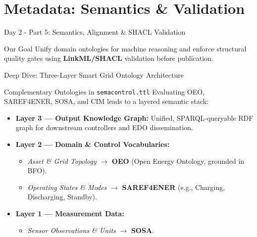\documentclass[aspectratio=169]{beamer}
\begin{document}
\section{Metadata: Semantics \& Validation}

\begin{frame}{Day 2 - Part 5: Semantics, Alignment \& SHACL Validation}
    \begin{block}{Our Goal}
        Unify domain ontologies for machine reasoning and enforce structural quality gates using \textbf{LinkML/SHACL} validation before publication.
    \end{block}
\end{frame}

\begin{frame}{Deep Dive: Three-Layer Smart Grid Ontology Architecture}
    \begin{block}{Complementary Ontologies in \texttt{semacontrol.ttl}}
        Evaluating OEO, SAREF4ENER, SOSA, and CIM leads to a layered semantic stack:
    \end{block}
    \begin{itemize}
        \item \textbf{Layer 3 — Output Knowledge Graph:} Unified, SPARQL-queryable RDF graph for downstream controllers and EDO dissemination.
        \item \textbf{Layer 2 — Domain \& Control Vocabularies:}
        \begin{itemize}
            \item \emph{Asset \& Grid Topology} $\rightarrow$ \textbf{OEO} (Open Energy Ontology, grounded in BFO).
            \item \emph{Operating States \& Modes} $\rightarrow$ \textbf{SAREF4ENER} (e.g., Charging, Discharging, Standby).
        \end{itemize}
        \item \textbf{Layer 1 — Measurement Data:}
        \begin{itemize}
            \item \emph{Sensor Observations \& Units} $\rightarrow$ \textbf{SOSA}.
        \end{itemize}
    \end{itemize}
\end{frame}
\end{document}
